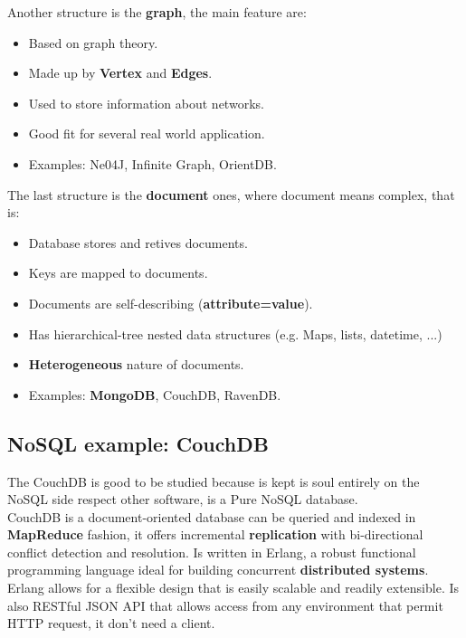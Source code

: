 \documentclass[12pt]{article}
\begin{document}
Another structure is the \textbf{graph}, the main feature are:
\begin{itemize}
  \item Based on graph theory.
  \item Made up by \textbf{Vertex} and \textbf{Edges}.
  \item Used to store information about networks.
  \item Good fit for several real world application.
  \item Examples: Ne04J, Infinite Graph, OrientDB.
\end{itemize}
The last structure is the \textbf{document} ones, where document means complex, that is:
\begin{itemize}
  \item Database stores and retives documents.
  \item Keys are mapped to documents.
  \item Documents are self-describing (\textbf{attribute=value}).
  \item Has hierarchical-tree nested data structures (e.g. Maps, lists, datetime, ...)
  \item \textbf{Heterogeneous} nature of documents.
  \item Examples: \textbf{MongoDB}, CouchDB, RavenDB.
\end{itemize}

\subsection{NoSQL example: CouchDB}
The CouchDB is good to be studied because is kept is soul entirely on the NoSQL side respect other software, is a Pure NoSQL database.\\
CouchDB is a document-oriented database can be queried and indexed in \textbf{MapReduce} fashion, it offers incremental \textbf{replication} with bi-directional conflict detection and resolution. Is written in Erlang, a robust functional programming language ideal for building concurrent \textbf{distributed systems}. Erlang allows for a flexible design that is easily scalable and readily extensible. Is also RESTful JSON API that allows access from any environment that permit HTTP request, it don't need a client.
\end{document}

